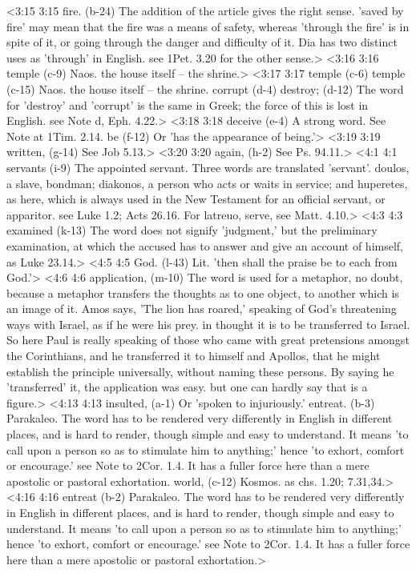 <3:15 3:15  fire. (b-24)  The addition of the article gives the right sense. 'saved by  fire' may mean that the fire was a means of safety, whereas  'through the fire' is in spite of it, or going through the  danger and difficulty of it. Dia has two distinct uses as  'through' in English. see 1Pet. 3.20 for the other sense.>
<3:16 3:16  temple (c-9)  Naos. the house itself -- the shrine.>
<3:17 3:17  temple (c-6)  temple (c-15)
  Naos. the house itself -- the shrine.
  corrupt (d-4)  destroy; (d-12)
  The word for 'destroy' and 'corrupt' is the same in Greek;  the force of this is lost in English. see Note d, Eph. 4.22.>
<3:18 3:18  deceive (e-4)  A strong word. See Note at 1Tim. 2.14.
  be (f-12)  Or 'has the appearance of being.'>
<3:19 3:19  written, (g-14)  See Job 5.13.>
<3:20 3:20  again, (h-2)  See Ps. 94.11.>
<4:1 4:1  servants (i-9)  The appointed servant. Three words are translated 'servant'.  doulos, a slave, bondman; diakonos, a person who acts or  waits in service; and huperetes, as here, which is always  used in the New Testament for an official servant, or  apparitor. see Luke 1.2; Acts 26.16. For latreuo, serve, see  Matt. 4.10.>
<4:3 4:3  examined (k-13)  The word does not signify 'judgment,' but the preliminary  examination, at which the accused has to answer and give an  account of himself, as Luke 23.14.>
<4:5 4:5  God. (l-43)  Lit. 'then shall the praise be to each from God.'>
<4:6 4:6  application, (m-10)  The word is used for a metaphor, no doubt, because a metaphor  transfers the thoughts as to one object, to another which is an  image of it. Amos says, 'The lion has roared,' speaking of  God's threatening ways with Israel, as if he were his prey. in  thought it is to be transferred to Israel. So here Paul is  really speaking of those who came with great pretensions  amongst the Corinthians, and he transferred it to himself and  Apollos, that he might establish the principle universally,  without naming these persons. By saying he 'transferred' it,  the application was easy. but one can hardly say that is a  figure.>
<4:13 4:13  insulted, (a-1)  Or 'spoken to injuriously.'
  entreat. (b-3)  Parakaleo. The word has to be rendered very differently in  English in different places, and is hard to render, though  simple and easy to understand. It means 'to call upon a person  so as to stimulate him to anything;' hence 'to exhort, comfort  or encourage.' see Note to 2Cor. 1.4. It has a fuller force  here than a mere apostolic or pastoral exhortation.
  world, (c-12)  Kosmos. as chs. 1.20; 7.31,34.>
<4:16 4:16  entreat (b-2)  Parakaleo. The word has to be rendered very differently in  English in different places, and is hard to render, though  simple and easy to understand. It means 'to call upon a person  so as to stimulate him to anything;' hence 'to exhort, comfort  or encourage.' see Note to 2Cor. 1.4. It has a fuller force  here than a mere apostolic or pastoral exhortation.>
